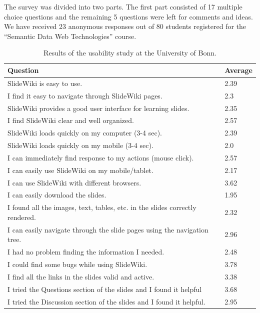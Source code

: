 \documentclass[PhD, Submit, ngerman,UKenglish,table]{scrbook}
\begin{document}
The survey was divided into two parts.
The first part consisted of 17 multiple choice questions and the remaining 5 questions were left for comments and ideas.
We have received 23 anonymous responses out of 80 students registered for the “Semantic Data Web Technologies” course.

\begin{table}[!h]
\centering

\begin{tabularx}{0.9\columnwidth}{ l l }    
    \toprule
    
    \textbf{Question} & \textbf{Average} \\
    \midrule
    \rowcolor{LightGray}
    SlideWiki is easy to use. & 2.39 \\
	\midrule
	\rowcolor{LightGray}
    I find it easy to navigate through SlideWiki pages. & 2.3 \\
    \midrule
    \rowcolor{LightGray}
    SlideWiki provides a good user interface for learning slides. & 2.35 \\
    \midrule
    \rowcolor{LightGray}
    I find SlideWiki clear and well organized. & 2.57 \\
    \midrule
    \rowcolor{Gray}
    SlideWiki loads quickly on my computer (3-4 sec). & 2.39 \\
    \midrule
    \rowcolor{Gray}
    SlideWiki loads quickly on my mobile (3-4 sec). & 2.0 \\
    \midrule
    \rowcolor{Gray}
    I can immediately find response to my actions (mouse click). & 2.57 \\
    \midrule
    \rowcolor{LightGray}
    I can easily use SlideWiki on my mobile/tablet. & 2.17 \\
    \midrule
    \rowcolor{LightGray}
    I can use SlideWiki with different browsers. & 3.62 \\
    \rowcolor{Gray}
    \midrule
    I can easily download the slides. & 1.95 \\
    \midrule
    I found all the images, text, tables, etc. in the slides correctly rendered. & 2.32 \\
    \midrule
    \rowcolor{LightGray}
    I can easily navigate through the slide pages using the navigation tree. & 2.96 \\
    \midrule
    \rowcolor{LightGray}
    I had no problem finding the information I needed. & 2.48 \\
    \midrule
    I could find some bugs while using SlideWiki. & 3.78 \\
    \midrule
    I find all the links in the slides valid and active. & 3.38 \\
    \midrule
    I tried the Questions section of the slides and I found it helpful & 3.68 \\
    \midrule
    I tried the Discussion section of the slides and I found it helpful. & 2.95 \\
	\bottomrule
    \end{tabularx}
\caption{Results of the usability study at the University of Bonn.}
\label{tab:bonn_evaluation}
\end{table}
\end{document}
